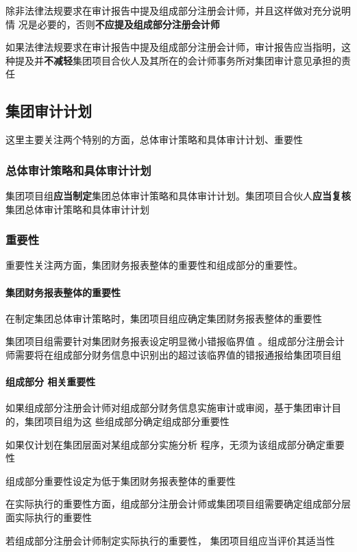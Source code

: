 \documentclass[UTF8,12pt]{ctexart}
\numberwithin{equation}{section} %
\numberwithin{figure}{section}
\numberwithin{table}{section}
\begin{document}
	除非法律法规要求在审计报告中提及组成部分注册会计师，并且这样做对充分说明情 况是必要的，否则\textbf{不应提及组成部分注册会计师}
	
	如果法律法规要求在审计报告中提及组成部分注册会计师，审计报告应当指明，这种提及并\textbf{不减轻}集团项目合伙人及其所在的会计师事务所对集团审计意见承担的责任
	
	\subsection{集团审计计划}
	这里主要关注两个特别的方面，总体审计策略和具体审计计划、重要性
	
	\subsubsection{总体审计策略和具体审计计划}
	集团项目组\textbf{应当制定}集团总体审计策略和具体审计计划。集团项目合伙人\textbf{应当复核}集团总体审计策略和具体审计计划
	
	\subsubsection{重要性}
	重要性关注两方面，集团财务报表整体的重要性和组成部分的重要性。
	
	\paragraph{集团财务报表整体的重要性}在制定集团总体审计策略时，集团项目组应确定集团财务报表整体的重要性
	
	集团项目组需要针对集团财务报表设定明显微小错报临界值 。组成部分注册会计师需要将在组成部分财务信息中识别出的超过该临界值的错报通报给集团项目组
	
	\paragraph{组成部分 相关重要性}
	如果组成部分注册会计师对组成部分财务信息实施审计或审阅，基于集团审计目的，集团项目组为这 些组成部分确定组成部分重要性
	
	如果仅计划在集团层面对某组成部分实施分析 程序，无须为该组成部分确定重要性
	
	组成部分重要性设定为低于集团财务报表整体的重要性
	
	在实际执行的重要性方面，组成部分注册会计师或集团项目组需要确定组成部分层面实际执行的重要性
	
	若组成部分注册会计师制定实际执行的重要性， 集团项目组应当评价其适当性
	
\end{document}
